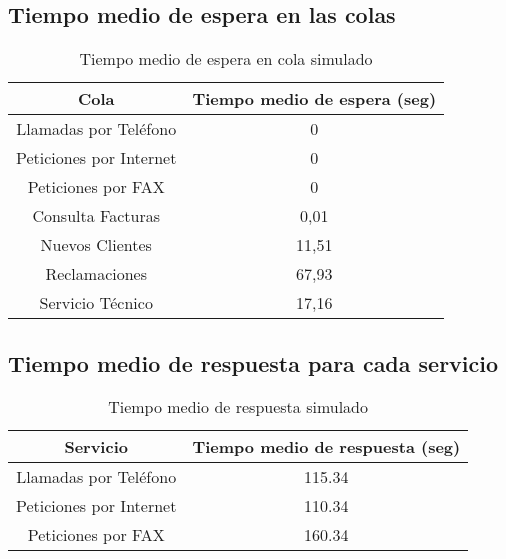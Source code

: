  \subsection{Tiempo medio de espera en las colas} 
  \begin{table}[H]
    \begin{center}
    \begin{tabular}{|c|c|}
      \hline
      \textbf{Cola}       & \textbf{Tiempo medio de espera (seg)} \\ \hline
      Llamadas por Teléfono   & 0                   \\ \hline
      Peticiones por Internet & 0                  \\ \hline
      Peticiones por FAX      & 0                   \\ \hline
      Consulta Facturas      & 0,01                   \\ \hline
      Nuevos Clientes      & 11,51                   \\ \hline
      Reclamaciones      & 67,93                   \\ \hline
      Servicio Técnico      & 17,16                  \\ \hline
    \end{tabular}
  \end{center}
    \caption{Tiempo medio de espera en cola simulado}
    \end{table}
    
  \subsection{Tiempo medio de respuesta para cada servicio}   
    \begin{table}[H]
      \begin{center}
      \begin{tabular}{|c|c|}
        \hline
        \textbf{Servicio}       & \textbf{Tiempo medio de respuesta (seg)} \\ \hline
        Llamadas por Teléfono   & 115.34                  \\ \hline
        Peticiones por Internet & 110.34                 \\ \hline
        Peticiones por FAX      & 160.34                   \\ \hline
      \end{tabular}
    \end{center}
      \caption{Tiempo medio de respuesta simulado}
      \end{table}
